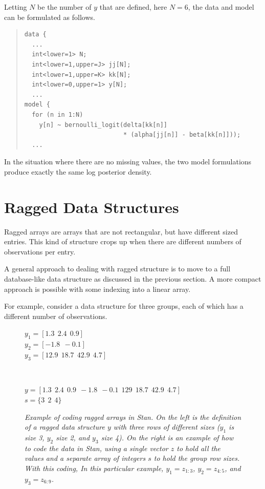 Letting $N$ be the number of $y$ that are defined, here $N=6$,
the data and model can be formulated as follows.
%
\begin{quote}
\begin{Verbatim}
data {
  ...
  int<lower=1> N;
  int<lower=1,upper=J> jj[N];
  int<lower=1,upper=K> kk[N];
  int<lower=0,upper=1> y[N];
  ...
model {
  for (n in 1:N)
    y[n] ~ bernoulli_logit(delta[kk[n]]
                           * (alpha[jj[n]] - beta[kk[n]]));
  ...
\end{Verbatim}
\end{quote}
%
In the situation where there are no missing values, the two model
formulations produce exactly the same log posterior density.


\section{Ragged Data Structures}

Ragged arrays are arrays that are not rectangular, but have different
sized entries.  This kind of structure crops up when there are
different numbers of observations per entry.  

A general approach to dealing with ragged structure is to move to a
full database-like data structure as discussed in the previous
section.  A more compact approach is possible with some indexing into
a linear array.

For example, consider a data structure for three groups, each of which
has a different number of observations.
%
\begin{figure}
\begin{center}
\begin{minipage}[c]{0.35\textwidth}
$y_1 =  \left[1.3 \ \ 2.4 \ \ 0.9\right]$
\\[3pt]
$y_2 = \left[-1.8 \ \ -0.1\right]$
\\[3pt]
$y_3 = \left[12.9 \ \ 18.7 \ \ 42.9 \ \ 4.7\right]$
\end{minipage}
\ \ \
\begin{minipage}[c]{0.60\textwidth}
$y = [1.3 \ \ 2.4 \ \ 0.9 \ \ -1.8 \ \ -0.1 \ \ 129 \ \ 18.7 \ \ 42.9
\ \ 4.7]$
\\[3pt]
$s  =  \{ 3 \ \ 2 \ \ 4 \}$
\end{minipage}
\end{center}
\caption{\small\it Example of coding ragged arrays in Stan.  On the
  left is the definition of a ragged data structure $y$ with three
  rows of different sizes ($y_1$ is size 3, $y_2$ size 2, and $y_3$
  size 4).  On the right is an example of how to code the data in Stan,
  using a single vector $z$ to hold all the values and a separate
  array of integers $s$ to hold the group row sizes.  With this
  coding, In this particular example, $y_1 = z_{1:3}$, $y_2 =
  z_{4:5}$, and $y_3 = z_{6:9}$.}\label{ragged-data.figure}
\end{figure}
%


